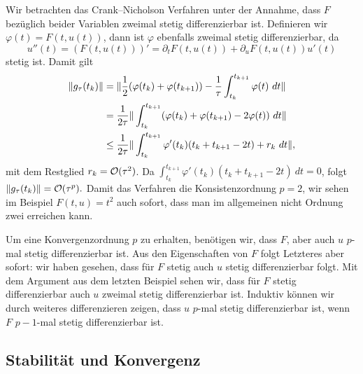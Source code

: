 \begin{example}{}{}
Wir betrachten das Crank--Nicholson Verfahren unter der Annahme, dass $F$ bezüglich beider Variablen zweimal stetig differenzierbar ist. Definieren wir $\varphi(t) = F(t,u(t))$, dann ist $\varphi$  ebenfalls zweimal stetig differenzierbar, da
$$ u''(t) = (F(t,u(t)))' = \partial_t F(t,u(t)) + \partial_u F(t,u(t)) u'(t) $$
stetig ist. Damit gilt
%
\begin{align*} 
\|g_\tau(t_k)\| &= \|\frac{1}2(\varphi(t_k)+\varphi(t_{k+1})) - \frac{1}\tau \int_{t_k}^{t_{k+1}} \varphi(t)~dt\|\\
&=    \frac{1}{2\tau}  \Vert \int_{t_k}^{t_{k+1}} (\varphi(t_k)+\varphi(t_{k+1})-2\varphi(t))~dt  \Vert \\
&\leq    \frac{1}{2\tau}   \Vert\int_{t_k}^{t_{k+1}} \varphi'(t_k)(t_k+t_{k+1}-2t) + r_k ~dt \Vert   ,
\end{align*}
%
mit dem Restglied $r_k={\cal O}(\tau^2)$. Da $\int_{t_k}^{t_{k+1}} \varphi'(t_k)(t_k+t_{k+1}-2t) ~dt = 0$, folgt 
$ \Vert g_\tau(t_k) \Vert = {\cal O}(\tau^p).$
Damit das Verfahren die Konsistenzordnung $p=2$, wir sehen im Beispiel $F(t,u) = t^2$ auch sofort, dass man im allgemeinen nicht Ordnung zwei erreichen kann. 
\end{example}
%
Um eine Konvergenzordnung $p$ zu erhalten, benötigen wir, dass $F$, aber auch $u$ $p$-mal stetig differenzierbar ist. Aus den Eigenschaften von $F$ folgt Letzteres aber sofort: wir haben gesehen, dass für $F$ stetig auch $u$ stetig differenzierbar folgt. Mit dem Argument aus dem letzten Beispiel sehen wir, dass für $F$ stetig differenzierbar auch $u$ zweimal stetig differenzierbar ist. Induktiv können wir durch weiteres differenzieren zeigen, dass $u$ $p$-mal stetig differenzierbar ist, wenn $F$ $p-1$-mal stetig differenzierbar ist. 
%
\subsection{Stabilität und Konvergenz}

